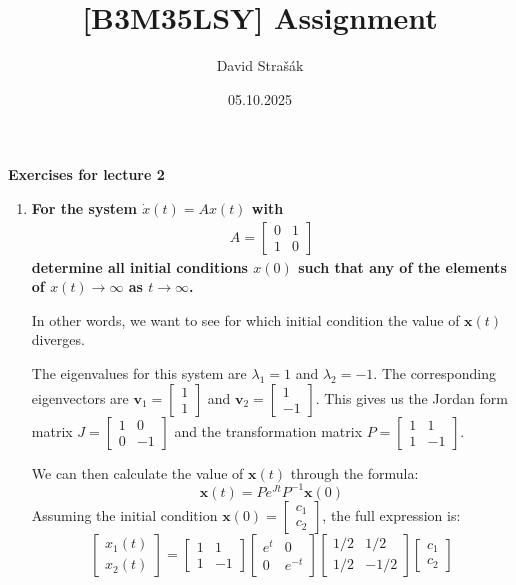 \documentclass[10pt]{article}
\title{[B3M35LSY] Assignment}
\author{David Strašák}
\date{05.10.2025}
\begin{document}
	\maketitle
	
	{\bf Exercises for lecture 2}
	
	\begin{enumerate}
		
		\item \textbf{For the system $\dot{x}(t) = Ax(t)$ with
		\begin{eqnarray*}
			A=\begin{bmatrix}
				0 & 1\\
				1 & 0 
			\end{bmatrix}
		\end{eqnarray*}
		determine all initial conditions $x(0)$ such that any of the elements of $x(t) \rightarrow \infty$ as $t \rightarrow \infty$.}
		
		In other words, we want to see for which initial condition the value of $\mathbf{x}(t)$ diverges.
		
		The eigenvalues for this system are $\lambda_1 = 1$ and $\lambda_2 = -1$.
		The corresponding eigenvectors are $\mathbf{v}_1 = \begin{bmatrix} 1 \\ 1 \end{bmatrix}$ and $\mathbf{v}_2 = \begin{bmatrix} 1 \\ -1 \end{bmatrix}$.
		This gives us the Jordan form matrix $J = \begin{bmatrix} 1 & 0 \\ 0 & -1 \end{bmatrix}$ and the transformation matrix $P = \begin{bmatrix} 1 & 1 \\ 1 & -1 \end{bmatrix}$.
		
		We can then calculate the value of $\mathbf{x}(t)$ through the formula:
		$$
		\mathbf{x}(t) = P e^{Jt} P^{-1} \mathbf{x}(0)
		$$
		Assuming the initial condition $\mathbf{x}(0) = \begin{bmatrix} c_1 \\ c_2 \end{bmatrix}$, the full expression is:
		$$
		\begin{bmatrix} x_1(t) \\ x_2(t) \end{bmatrix} = \begin{bmatrix} 1 & 1 \\ 1 & -1 \end{bmatrix} \begin{bmatrix} e^t & 0 \\ 0 & e^{-t} \end{bmatrix} \begin{bmatrix} 1/2 & 1/2 \\ 1/2 & -1/2 \end{bmatrix} \begin{bmatrix} c_1 \\ c_2 \end{bmatrix}
		$$
		

\end{enumerate}
\end{document}
